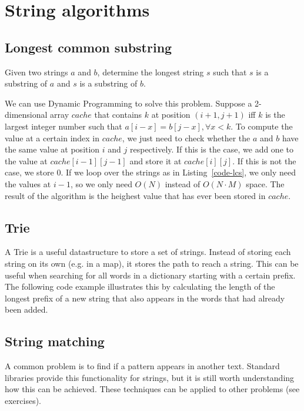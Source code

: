 \section{String algorithms}

\subsection{Longest common substring}
Given two strings $a$ and $b$, determine the longest string $s$ such that $s$ is a substring of $a$ and $s$ is a substring of $b$.

We can use Dynamic Programming to solve this problem. Suppose a 2-dimensional array $cache$ that contains $k$ at position $(i+1,j+1)$ iff $k$ is the largest integer number such that $a[i-x]=b[j-x], \forall x < k$. 
To compute the value at a certain index in $cache$, we just need to check whether the $a$ and $b$ have the same value at position $i$ and $j$ respectively. If this is the case, we add one to the value at $cache[i-1][j-1]$ and store it at $cache[i][j]$. If this is not the case, we store 0.
If we loop over the strings as in Listing~\ref{code-lcs}, we only need the values at $i-1$, so we only need $O(N)$ instead of $O(N \cdot M)$ space. The result of the algorithm is the heighest value that has ever been stored in $cache$.



\subsection{Trie}
A Trie is a useful datastructure to store a set of strings. Instead of storing each string on its own (e.g. in a map), it stores the path to reach a string. This can be useful when searching for all words in a dictionary starting with a certain prefix. The following code example illustrates this by calculating the length of the longest prefix of a new string that also appears in the words that had already been added.


\subsection{String matching}
A common problem is to find if a pattern appears in another text. Standard libraries provide this functionality for strings, but it is still worth understanding how this can be achieved. These techniques can be applied to other problems (see exercises).

